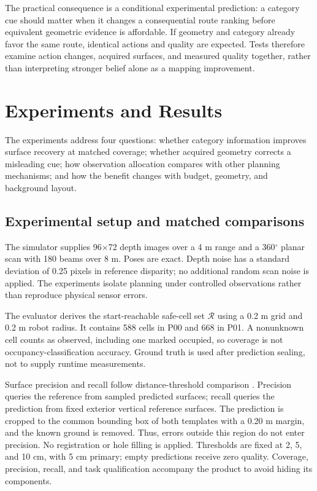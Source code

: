 \documentclass[pdflatex,sn-mathphys-num]{sn-jnl}
\begin{document}
The practical consequence is a conditional experimental prediction: a category cue should matter when it changes a consequential route ranking before equivalent geometric evidence is affordable. If geometry and category already favor the same route, identical actions and quality are expected. Tests therefore examine action changes, acquired surfaces, and measured quality together, rather than interpreting stronger belief alone as a mapping improvement.

\hypertarget{experiments-and-results}{%
\section{Experiments and Results}\label{experiments-and-results}}

The experiments address four questions: whether category information improves surface recovery at matched coverage; whether acquired geometry corrects a misleading cue; how observation allocation compares with other planning mechanisms; and how the benefit changes with budget, geometry, and background layout.

\hypertarget{experimental-setup-and-matched-comparisons}{%
\subsection{Experimental setup and matched comparisons}\label{experimental-setup-and-matched-comparisons}}

The simulator supplies 96\ensuremath{\times}72 depth images over a 4 m range and a 360\ensuremath{^{\circ}} planar scan with 180 beams over 8 m. Poses are exact. Depth noise has a standard deviation of 0.25 pixels in reference disparity; no additional random scan noise is applied. The experiments isolate planning under controlled observations rather than reproduce physical sensor errors.

The evaluator derives the start-reachable safe-cell set \(\mathcal R\) using a 0.2 m grid and 0.2 m robot radius. It contains 588 cells in P00 and 668 in P01. A nonunknown cell counts as observed, including one marked occupied, so coverage is not occupancy-classification accuracy. Ground truth is used after prediction sealing, not to supply runtime measurements.

Surface precision and recall follow distance-threshold comparison \cite{ref14}. Precision queries the reference from sampled predicted surfaces; recall queries the prediction from fixed exterior vertical reference surfaces. The prediction is cropped to the common bounding box of both templates with a 0.20 m margin, and the known ground is removed. Thus, errors outside this region do not enter precision. No registration or hole filling is applied. Thresholds are fixed at 2, 5, and 10 cm, with 5 cm primary; empty predictions receive zero quality. Coverage, precision, recall, and task qualification accompany the product to avoid hiding its components.
\end{document}
